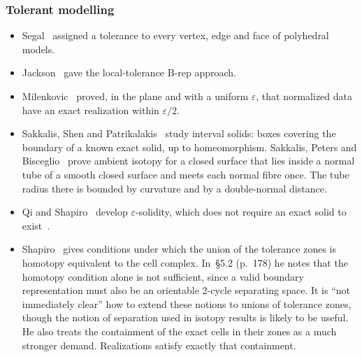 \documentclass[preprint,12pt]{elsarticle}
\theoremstyle{definition}
\theoremstyle{remark}
\begin{document}
\subsubsection*{Tolerant modelling}
\begin{itemize}
\item Segal~\cite{Segal90} assigned a tolerance to every vertex, edge and face of polyhedral models.
\item Jackson~\cite{Jackson95} gave the local-tolerance B-rep approach.
\item Milenkovic~\cite{Milenkovic88} proved, in the plane and with a uniform $\varepsilon$, that normalized data have an
exact realization within $\varepsilon/2$.
\item Sakkalis, Shen and Patrikalakis~\cite{SSP01} study interval solids: boxes covering the boundary of a known exact
solid, up to homeomorphism. Sakkalis, Peters and Bisceglio~\cite[Thm.~10]{SPB04} prove ambient isotopy for a closed
surface that lies inside a normal tube of a smooth closed surface and meets each normal fibre once. The tube radius
there is bounded by curvature and by a double-normal distance.
\item Qi and Shapiro~\cite{QiShapiro06} develop $\varepsilon$-solidity, which does not require an exact solid to
exist~\cite{QiShapiro06b}.
\item Shapiro~\cite{Shapiro08} gives conditions under which the union of the tolerance zones is homotopy equivalent
to the cell complex. In~\S5.2 (p.~178) he notes that the homotopy condition alone is not sufficient, since a valid
boundary representation must also be an orientable 2-cycle separating space. It is ``not immediately clear'' how to
extend these notions to unions of tolerance zones, though the notion of separation used in isotopy results is likely
to be useful. He also treats the containment of the exact cells in their zones as a much stronger demand.
Realizations satisfy exactly that containment.
\end{itemize}
\end{document}
